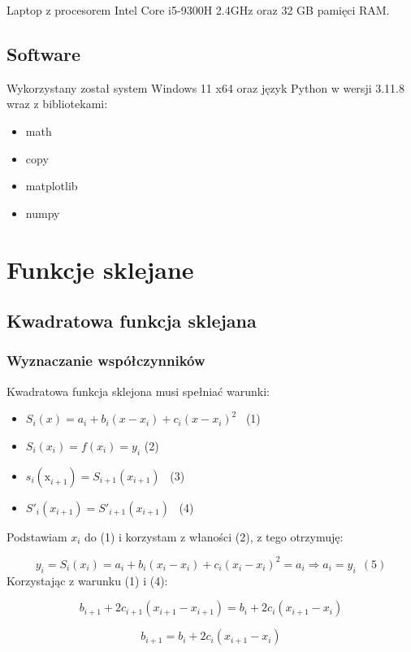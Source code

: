 \documentclass{article}
\begin{document}
Laptop z procesorem Intel Core i5-9300H 2.4GHz oraz 32 GB pamięci RAM.

\subsection{Software}

Wykorzystany został system Windows 11 x64 oraz język Python w wersji 3.11.8 wraz z bibliotekami:
\begin{itemize}
\item math
\item copy
\item matplotlib
\item numpy
\end{itemize}

\section{Funkcje sklejane}

\subsection{Kwadratowa funkcja sklejana}

\subsubsection{Wyznaczanie współczynników}

Kwadratowa funkcja sklejona musi spełniać warunki:

\begin{itemize}
    \item \( S_i (x) = a_i + b_i(x - x_i) + c_i(x - x_i)^2\) \ (1)
    \item \(S_i(x_i) = f(x_i) = y_i\) (2)
    \item \(s_i(\mathrm{x}_{i+1}^{}) = S_{i + 1}(x_{i+1})\) \ (3)
    \item \(S'_i(x_{i+1}) = S'_{i+1}(x_{i+1})\) \ (4)
\end{itemize}

\noindent
Podstawiam \(x_i\) do (1) i korzystam z właności (2), z tego otrzymuję:

\[y_i = S_i (x_i) = a_i + b_i(x_i - x_i) + c_i(x_i - x_i)^2 = a_i \Rightarrow  a_i = y_i \ \ (5)\] 
\noindent
Korzystając z warunku (1) i (4):

\[b_{i+1} + 2c_{i+1}(x_{i+1}-x_{i+1}) = b_i + 2c_i(x_{i+1} - x_i)\]

\[b_{i+1} = b_i + 2c_i(x_{i+1} - x_i)\]
\end{document}
